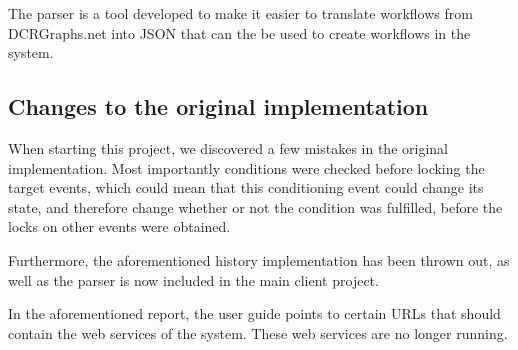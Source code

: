 		\newpar The parser is a tool developed to make it easier to translate workflows from DCRGraphs.net into JSON that can the be used to create workflows in the system.
		
		\subsection{Changes to the original implementation}
			When starting this project, we discovered a few mistakes in the original implementation. Most importantly conditions were checked before locking the target events, which could mean that this conditioning event could change its state, and therefore change whether or not the condition was fulfilled, before the locks on other events were obtained. 
            
            Furthermore, the aforementioned history implementation has been thrown out, as well as the parser is now included in the main client project.

			\newpar In the aforementioned report, the user guide points to certain URLs that should contain the web services of the system. These web services are no longer running.